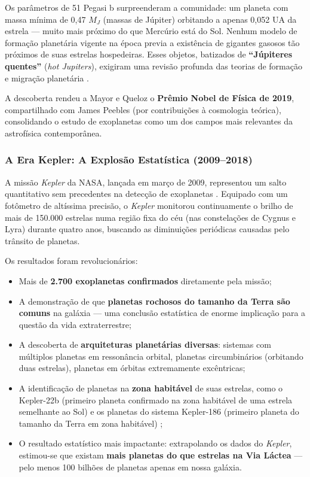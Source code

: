 \documentclass[
	12pt,
	openany,
	oneside,
	a4paper,
	english,
	brazil
]{abntex2}
\begin{document}
Os parâmetros de 51 Pegasi b surpreenderam a comunidade: um planeta com massa mínima de 0,47 $M_J$ (massas de Júpiter) orbitando a apenas 0,052 UA da estrela --- muito mais próximo do que Mercúrio está do Sol. Nenhum modelo de formação planetária vigente na época previa a existência de gigantes gasosos tão próximos de suas estrelas hospedeiras. Esses objetos, batizados de \textbf{``Júpiteres quentes''} (\textit{hot Jupiters}), exigiram uma revisão profunda das teorias de formação e migração planetária \cite{perryman2018}.

A descoberta rendeu a Mayor e Queloz o \textbf{Prêmio Nobel de Física de 2019}, compartilhado com James Peebles (por contribuições à cosmologia teórica), consolidando o estudo de exoplanetas como um dos campos mais relevantes da astrofísica contemporânea.

\subsubsection{A Era Kepler: A Explosão Estatística (2009--2018)}

A missão \textit{Kepler} da NASA, lançada em março de 2009, representou um salto quantitativo sem precedentes na detecção de exoplanetas \cite{borucki2010}. Equipado com um fotômetro de altíssima precisão, o \textit{Kepler} monitorou continuamente o brilho de mais de 150.000 estrelas numa região fixa do céu (nas constelações de Cygnus e Lyra) durante quatro anos, buscando as diminuições periódicas causadas pelo trânsito de planetas.

Os resultados foram revolucionários:

\begin{itemize}
  \item Mais de \textbf{2.700 exoplanetas confirmados} diretamente pela missão;
  \item A demonstração de que \textbf{planetas rochosos do tamanho da Terra são comuns} na galáxia --- uma conclusão estatística de enorme implicação para a questão da vida extraterrestre;
  \item A descoberta de \textbf{arquiteturas planetárias diversas}: sistemas com múltiplos planetas em ressonância orbital, planetas circumbinários (orbitando duas estrelas), planetas em órbitas extremamente excêntricas;
  \item A identificação de planetas na \textbf{zona habitável} de suas estrelas, como o Kepler-22b (primeiro planeta confirmado na zona habitável de uma estrela semelhante ao Sol) e os planetas do sistema Kepler-186 (primeiro planeta do tamanho da Terra em zona habitável) \cite{nasaexoplanet2024};
  \item O resultado estatístico mais impactante: extrapolando os dados do \textit{Kepler}, estimou-se que existam \textbf{mais planetas do que estrelas na Via Láctea} --- pelo menos 100 bilhões de planetas apenas em nossa galáxia.
\end{itemize}
\end{document}
